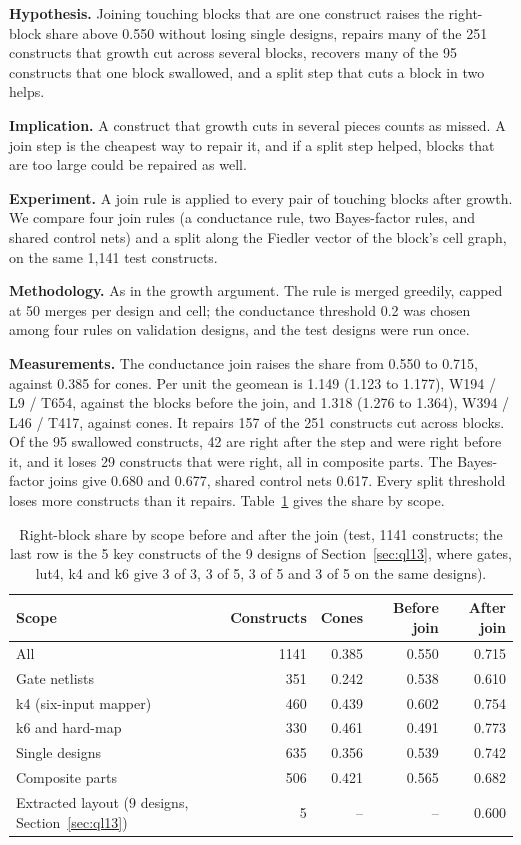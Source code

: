 \documentclass[conference]{IEEEtran}
\newcommand{\hev}[1]{\par\smallskip\noindent\textbf{#1}}
\begin{document}
\hev{Hypothesis.} Joining touching blocks that are one construct raises the right-block share above 0.550 without losing single designs, repairs many of the 251 constructs that growth cut across several blocks, recovers many of the 95 constructs that one block swallowed, and a split step that cuts a block in two helps.

\hev{Implication.} A construct that growth cuts in several pieces counts as missed. A join step is the cheapest way to repair it, and if a split step helped, blocks that are too large could be repaired as well.

\hev{Experiment.} A join rule is applied to every pair of touching blocks after growth. We compare four join rules (a conductance rule, two Bayes-factor rules, and shared control nets) and a split along the Fiedler vector of the block's cell graph, on the same 1,141 test constructs.

\hev{Methodology.} As in the growth argument. The rule is merged greedily, capped at 50 merges per design and cell; the conductance threshold 0.2 was chosen among four rules on validation designs, and the test designs were run once.

\hev{Measurements.} The conductance join raises the share from 0.550 to 0.715, against 0.385 for cones. Per unit the geomean is 1.149 (1.123 to 1.177), W194 / L9 / T654, against the blocks before the join, and 1.318 (1.276 to 1.364), W394 / L46 / T417, against cones. It repairs 157 of the 251 constructs cut across blocks. Of the 95 swallowed constructs, 42 are right after the step and were right before it, and it loses 29 constructs that were right, all in composite parts. The Bayes-factor joins give 0.680 and 0.677, shared control nets 0.617. Every split threshold loses more constructs than it repairs. Table~\ref{tab:join} gives the share by scope.

\begin{table}[t]
\caption{Right-block share by scope before and after the join (test, 1141 constructs; the last row is the 5 key constructs of the 9 designs of Section~\ref{sec:ql13}, where gates, lut4, k4 and k6 give 3 of 3, 3 of 5, 3 of 5 and 3 of 5 on the same designs).}
\label{tab:join}
\centering
\footnotesize
\begin{tabular}{@{}lrrrr@{}}
\toprule
Scope & Constructs & Cones & Before join & After join \\
\midrule
All & 1141 & 0.385 & 0.550 & 0.715 \\
Gate netlists & 351 & 0.242 & 0.538 & 0.610 \\
k4 (six-input mapper) & 460 & 0.439 & 0.602 & 0.754 \\
k6 and hard-map & 330 & 0.461 & 0.491 & 0.773 \\
Single designs & 635 & 0.356 & 0.539 & 0.742 \\
Composite parts & 506 & 0.421 & 0.565 & 0.682 \\
\midrule
Extracted layout (9 designs, Section~\ref{sec:ql13}) & 5 & -- & -- & 0.600 \\
\bottomrule
\end{tabular}
\end{table}
\end{document}
